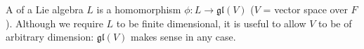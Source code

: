 A  of a Lie algebra $L$ is a homomorphism $\phi: L \rightarrow \mathfrak{gl}(V)$ ($V$ = vector space over $F$). Although we require $L$ to be finite dimensional, it is useful to allow $V$ to be of arbitrary dimension: $\mathfrak{gl}(V)$ makes sense in any case.
